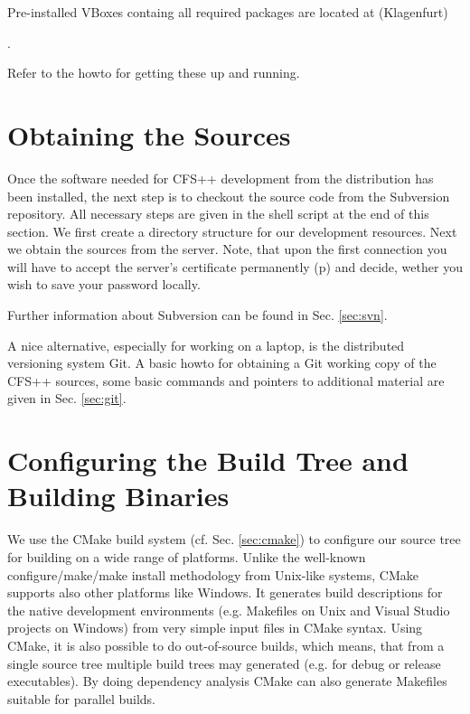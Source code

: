 Pre-installed   VBoxes  containg   all  required   packages  are   located  at
(Klagenfurt)

.

Refer   to   the   howto   for getting
these up and running.

\newpage
\section{Obtaining the Sources}

Once the software  needed for CFS++ development from  the distribution has
been installed,  the next  step is  to checkout the  source code  from the
Subversion  \cite{svn} repository. All  necessary steps  are given  in the
shell  script at  the end  of this  section. We  first create  a directory
structure for our  development resources. Next we obtain  the sources from
the server. Note,  that upon the first connection you  will have to accept
the server's  certificate permanently (p)  and decide, wether you  wish to
save your password locally.



Further information  about Subversion can be found  in Sec. \ref{sec:svn}.

A nice alternative, especially for working on a laptop, is the distributed
versioning system Git.  A basic howto for obtaining a  Git working copy of
the CFS++ sources, some basic commands and pointers to additional material
are given in Sec. \ref{sec:git}.

\section{Configuring the Build Tree and Building Binaries}

We  use the CMake  build system  (cf. Sec.  \ref{sec:cmake}) to  configure our
source tree for building on a  wide range of platforms.  Unlike the well-known
configure/make/make install methodology from Unix-like systems, CMake supports
also other  platforms like Windows.   It generates build descriptions  for the
native  development environments (e.g.   Makefiles on  Unix and  Visual Studio
projects  on Windows)  from very  simple input  files in  CMake  syntax. Using
CMake, it is also possible to  do out-of-source builds, which means, that from
a single  source tree multiple  build trees may  generated (e.g. for  debug or
release  executables). By doing  dependency analysis  CMake can  also generate
Makefiles suitable for parallel builds.

